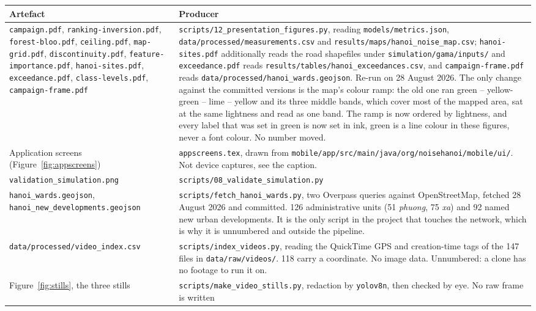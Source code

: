 \documentclass[11pt,a4paper]{article}
\newcommand{\pth}[1]{\texttt{\small #1}}
\begin{document}
\begin{center}\small
\begin{tabular}{@{}p{4.4cm}p{9.4cm}@{}}
\toprule
\textbf{Artefact} & \textbf{Producer} \\
\midrule
\pth{campaign.pdf}, \pth{ranking-inversion.pdf}, \pth{forest-bloo.pdf},
\pth{ceiling.pdf}, \pth{map-grid.pdf}, \pth{discontinuity.pdf},
\pth{feature-importance.pdf}, \pth{hanoi-sites.pdf}, \pth{exceedance.pdf},
\pth{class-levels.pdf}, \pth{campaign-frame.pdf}
 & \pth{scripts/12\_presentation\_figures.py}, reading
 \pth{models/metrics.json}, \pth{data/processed/measurements.csv} and
 \pth{results/maps/hanoi\_noise\_map.csv}; \pth{hanoi-sites.pdf} additionally
 reads the road shapefiles under \pth{simulation/gama/inputs/} and
 \pth{exceedance.pdf} reads
 \pth{results/tables/hanoi\_exceedances.csv}, and \pth{campaign-frame.pdf}
 reads \pth{data/processed/hanoi\_wards.geojson}. Re-run on 28 August 2026.
 The
 only change against the committed versions is the map's colour ramp: the
 old one ran green -- yellow-green -- lime -- yellow and its three middle
 bands, which cover most of the mapped area, sat at the same lightness and
 read as one band. The ramp is now ordered by lightness, and every label
 that was set in green is now set in ink, green is a line colour in these
 figures, never a font colour. No number moved. \\
Application screens (Figure~\ref{fig:appscreens}) & \pth{appscreens.tex}, drawn
 from \pth{mobile/app/src/main/java/org/noisehanoi/mobile/ui/}. Not device
 captures, see the caption. \\
\pth{validation\_simulation.png} & \pth{scripts/08\_validate\_simulation.py} \\
\pth{hanoi\_wards.geojson}, \pth{hanoi\_new\_developments.geojson} &
 \pth{scripts/fetch\_hanoi\_wards.py}, two Overpass queries against
 OpenStreetMap, fetched 28 August 2026 and committed. 126 administrative units
 (51 \emph{phuong}, 75 \emph{xa}) and 92 named new urban developments. It is
 the only script in the project that touches the network, which is why it is
 unnumbered and outside the pipeline. \\
\pth{data/processed/video\_index.csv} & \pth{scripts/index\_videos.py}, reading
 the QuickTime GPS and creation-time tags of the 147 files in
 \pth{data/raw/videos/}. 118 carry a coordinate. No image data. Unnumbered:
 a clone has no footage to run it on. \\
Figure~\ref{fig:stills}, the three stills & \pth{scripts/make\_video\_stills.py}, redaction by \pth{yolov8n}, then checked by eye. No raw frame is written

\end{tabular}
\end{center}
\end{document}
